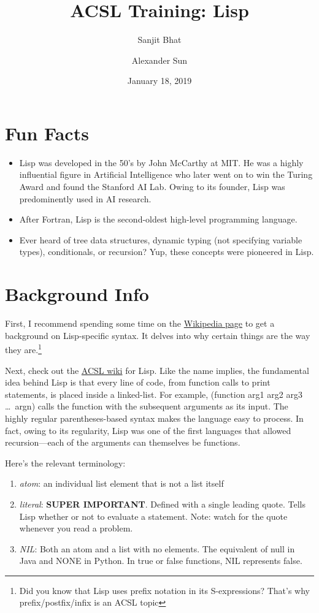 \documentclass[11pt,letterpaper]{article}
\title{ACSL Training: Lisp}
\author{Sanjit Bhat \and Alexander Sun}
\date{January 18, 2019}
\begin{document}
    \maketitle
    \section{Fun Facts}
    \begin{itemize}
        \item Lisp was developed in the 50's by John McCarthy at MIT.
        He was a highly influential figure in Artificial Intelligence who later
        went on to win the Turing Award and found the Stanford AI Lab.
        Owing to its founder, Lisp was predominently used in AI research.
        \item After Fortran, Lisp is the second-oldest high-level programming language.
        \item Ever heard of tree data structures, dynamic typing (not specifying variable types), conditionals, or recursion?
        Yup, these concepts were pioneered in Lisp.
    \end{itemize}

    \section{Background Info}
    First, I recommend spending some time on the
    \href{https://en.wikipedia.org/wiki/Lisp_(programming_language)#Syntax_and_semantics}{Wikipedia page} to get a background on Lisp-specific syntax.
    It delves into why certain things are the way they are.\footnote{Did
    you know that Lisp uses prefix notation in its S-expressions?
    That's why prefix/postfix/infix is an ACSL topic}

    Next, check out the \href{http://www.categories.acsl.org/wiki/index.php?title=LISP}{ACSL wiki} for Lisp.
    Like the name implies, the fundamental idea behind Lisp is that every
    line of code, from function calls to print statements,
    is placed inside a linked-list.
    For example, (function arg1 arg2 arg3 \ldots~argn)
    calls the function with the subsequent arguments as its input.
    The highly regular parentheses-based syntax makes the language
    easy to process.
    In fact, owing to its regularity, Lisp was one of the first languages
    that allowed recursion---each of the arguments can themselves
    be functions.

    Here's the relevant terminology:
    \begin{enumerate}
        \item \textit{atom}: an individual list element that is not a list itself
        \item \textit{literal}: \textbf{SUPER IMPORTANT}.
        Defined with a single leading quote.
        Tells Lisp whether or not to evaluate a statement.
        Note: watch for the quote whenever you read a problem.
        \item \textit{NIL}: Both an atom and a list with no elements.
        The equivalent of null in Java and NONE in Python.
        In true or false functions, NIL represents false.
    \end{enumerate}
\end{document}
